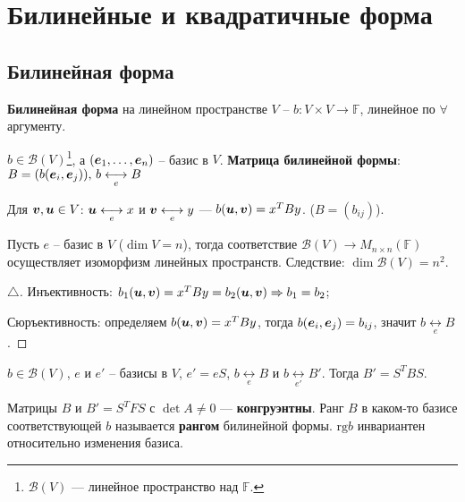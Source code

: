 \section{Билинейные и квадратичные форма}

\subsection{Билинейная форма}
\begin{to_def} 
	\textbf{Билинейная форма} на линейном пространстве $V$ -- $b \colon V \times V \to \mathbb{F}$, линейное по $\forall$ аргументу.
\end{to_def}

\begin{to_def} 
	$b \in \mathcal{B} (V)$\footnote{$\mathcal{B}(V)$ --- линейное пространство над $\mathbb{F}$.}, а $(\mbox{\boldmath $e$}_{1},\ldots,\mbox{\boldmath $e$}_n)$ -- базис в $V $. \textbf{Матрица билинейной формы}: $B = (b(\mbox{\boldmath $e$}_i,\mbox{\boldmath $e$}_j)), \, b \underset{e}{\longleftrightarrow}  B $

	Для $\mbox{\boldmath $v$},\mbox{\boldmath $u$} \in V$: $\mbox{\boldmath $u$} \underset{e}{\longleftrightarrow} x$ и $\mbox{\boldmath $v$} \underset{e}{\longleftrightarrow} y$ --- $b(\mbox{\boldmath $u$}, \mbox{\boldmath $v$}) = x^T B y$. ($B = (b_{i j})$).
\end{to_def}

\begin{to_thr} 
	Пусть $e$ -- базис в $V$ ($\dim V = n$), тогда соответствие $\mathcal{B}(V) \rightarrow M_{n\times n}(\mathbb{F})$ осуществляет изоморфизм линейных пространств. Следствие: $\dim \mathcal{B}(V) = n^2$.
\end{to_thr}
 \begin{proof}[$\triangle$]
 	Инъективность: $b_1 (\mbox{\boldmath $u$},\mbox{\boldmath $v$}) = x^T B y = b_2(\mbox{\boldmath $u$},\mbox{\boldmath $v$}) \Rightarrow b_1 = b_2$;

 	Сюръективность: определяем $b(\mbox{\boldmath $u$},\mbox{\boldmath $v$}) = x^T B y$, тогда $b(\mbox{\boldmath $e$}_i, \mbox{\boldmath $e$}_j) = b_{i j}$, значит $b \underset{e}{\longleftrightarrow} B$.
 \end{proof}

\begin{to_thr}
	$b \in \mathcal{B}(V)$, $e$ и $e'$ -- базисы в $V$, $e' = e S$,
	$b\underset{e}{\longleftrightarrow} B$ и $b \underset{e'}{\longleftrightarrow} B'$. Тогда $B' = S^T B S$.
\end{to_thr}

\begin{to_def} 
	Матрицы $B$ и $B' = S^T F S$ с $\det A \neq 0$ --- \textbf{конгруэнтны}. Ранг $B$ в каком-то базисе соответствующей $b$ называется \textbf{рангом} билинейной формы. $\text{rg}b$ инвариантен относительно изменения базиса.
\end{to_def}

